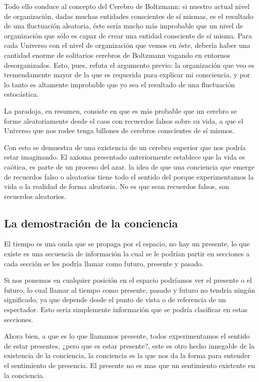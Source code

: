 \documentclass[12pt,letterpaper, a4paper ]{article}
\begin{document}
Todo ello conduce al concepto del Cerebro de Boltzmann: si nuestro actual nivel de organización, dadas muchas entidades conscientes de sí mismas, es el resultado de una fluctuación aleatoria, éste sería mucho más improbable que un nivel de organización que sólo es capaz de crear una entidad consciente de sí misma. Para cada Universo con el nivel de organización que vemos en éste, debería haber una cantidad enorme de solitarios cerebros de Boltzmann vagando en entornos desorganizados. Esto, pues, refuta el argumento previo: la organización que veo es tremendamente mayor de la que es requerida para explicar mi consciencia, y por lo tanto es altamente improbable que yo sea el resultado de una fluctuación estocástica.

La paradoja, en resumen, consiste en que es más probable que un cerebro se forme aleatoriamente desde el caos con recuerdos falsos sobre su vida, a que el Universo que nos rodee tenga billones de cerebros conscientes de sí mismos.

Con esto se demuestra de una existencia de un cerebro superior que nos podría estar imaginando. El axioma presentado anteriormente establece que la vida es caótica, es parte de un proceso del azar. la idea de que una conciencia que emerge de recuerdos falso o aleatorios tiene todo el sentido del porque experimentamos la vida o la realidad de forma aleatoria. No es que sean recuerdos falsos, son recuerdos aleatorios.


\subsection{La demostración de la conciencia}

El tiempo es una onda que se propaga por el espacio, no hay un presente, lo que existe es una secuencia de información la cual se le podrían partir en secciones a cada sección se les podría llamar como futuro, presente y pasado.

Si nos ponemos en cualquier posición en el espacio podríamos ver el presente o el futuro, lo cual llamar al tiempo como presente, pasado y futuro no tendría ningún significado, ya que depende desde el punto de vista o de referencia de un espectador. Esto seria simplemente información que se podría clasificar en estas secciones.


Ahora bien, a que es lo que llamamos presente, todos experimentamos el sentido de estar presentes, ¿pero que es estar presente?, este es otro hecho innegable de la existencia de la conciencia, la conciencia es la que nos da la forma para entender el sentimiento de presencia. El presente no es mas que un sentimiento existente en la conciencia.
\end{document}
